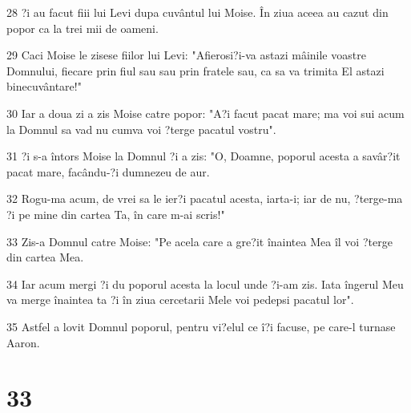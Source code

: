 \par 28 ?i au facut fiii lui Levi dupa cuvântul lui Moise. În ziua aceea au cazut din popor ca la trei mii de oameni.
\par 29 Caci Moise le zisese fiilor lui Levi: "Afierosi?i-va astazi mâinile voastre Domnului, fiecare prin fiul sau sau prin fratele sau, ca sa va trimita El astazi binecuvântare!"
\par 30 Iar a doua zi a zis Moise catre popor: "A?i facut pacat mare; ma voi sui acum la Domnul sa vad nu cumva voi ?terge pacatul vostru".
\par 31 ?i s-a întors Moise la Domnul ?i a zis: "O, Doamne, poporul acesta a savâr?it pacat mare, facându-?i dumnezeu de aur.
\par 32 Rogu-ma acum, de vrei sa le ier?i pacatul acesta, iarta-i; iar de nu, ?terge-ma ?i pe mine din cartea Ta, în care m-ai scris!"
\par 33 Zis-a Domnul catre Moise: "Pe acela care a gre?it înaintea Mea îl voi ?terge din cartea Mea.
\par 34 Iar acum mergi ?i du poporul acesta la locul unde ?i-am zis. Iata îngerul Meu va merge înaintea ta ?i în ziua cercetarii Mele voi pedepsi pacatul lor".
\par 35 Astfel a lovit Domnul poporul, pentru vi?elul ce î?i facuse, pe care-l turnase Aaron.

\chapter{33}

